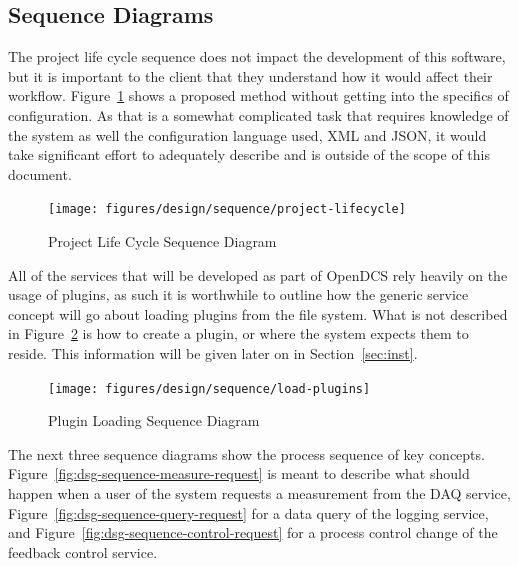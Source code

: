   \newpage

  \subsection{Sequence Diagrams}\label{sec:dsg-sequence}

    The project life cycle sequence does not impact the development of this
    software, but it is important to the client that they understand how it
    would affect their workflow. Figure~\ref{fig:dsg-sequence-life-cycle} shows
    a proposed method without getting into the specifics of configuration. As
    that is a somewhat complicated task that requires knowledge of the system as
    well the configuration language used, XML and JSON, it would take
    significant effort to adequately describe and is outside of the scope of
    this document.

    \begin{figure}[H]
      \texttt{[image: figures/design/sequence/project-lifecycle]}
      \caption{Project Life Cycle Sequence Diagram}
      \label{fig:dsg-sequence-life-cycle}
    \end{figure}

    \newpage

    All of the services that will be developed as part of OpenDCS rely heavily
    on the usage of plugins, as such it is worthwhile to outline how the generic
    service concept will go about loading plugins from the file system. What is
    not described in Figure~\ref{fig:dsg-sequence-load-plugins} is how to create
    a plugin, or where the system expects them to reside. This information will
    be given later on in Section~\ref{sec:inst}.

    \begin{figure}[H]
      \texttt{[image: figures/design/sequence/load-plugins]}
      \caption{Plugin Loading Sequence Diagram}
      \label{fig:dsg-sequence-load-plugins}
    \end{figure}

    The next three sequence diagrams show the process sequence of key concepts.
    Figure~\ref{fig:dsg-sequence-measure-request} is meant to describe what
    should happen when a user of the system requests a measurement from the DAQ
    service, Figure~\ref{fig:dsg-sequence-query-request} for a data query of
    the logging service, and Figure~\ref{fig:dsg-sequence-control-request} for
    a process control change of the feedback control service.

    \newpage

